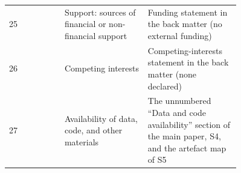 \begin{table}[htbp]
\begin{tabular}{@{}l p{0.36\linewidth} p{0.40\linewidth}@{}}
25 & \raggedright Support: sources of financial or non-financial support & \raggedright Funding statement in the back matter (no external funding) \tabularnewline
26 & \raggedright Competing interests & \raggedright Competing-interests statement in the back matter (none declared) \tabularnewline
27 & \raggedright Availability of data, code, and other materials & \raggedright The unnumbered ``Data and code availability'' section of the main paper, S4, and the artefact map of S5 \tabularnewline
\bottomrule
\end{tabular}
\end{table}


